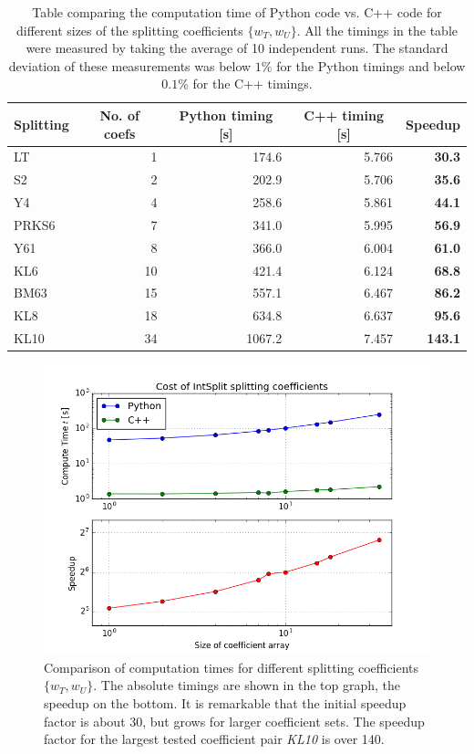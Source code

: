 %
\begin{table}[h]
	\centering
	\begin{tabular}{|l | r | r | r | r |} 
		\hline
		\multicolumn{1}{|c}{\textbf{Splitting}} &
		\multicolumn{1}{|c}{\textbf{No. of coefs}} &
		\multicolumn{1}{|c}{\textbf{Python timing [s]}} &
		\multicolumn{1}{|c}{\textbf{C++ timing [s]}} &
		\multicolumn{1}{|c|}{\textbf{Speedup}} \\
		\hline
		LT & 1 & 174.6 & 5.766 &\textbf{30.3} \\ 
		S2 & 2 & 202.9 & 5.706 &\textbf{35.6} \\
		Y4 & 4 & 258.6 & 5.861 &\textbf{44.1} \\
		PRKS6 & 7 & 341.0 & 5.995 &\textbf{56.9} \\ 
		Y61 & 8 & 366.0 & 6.004 &\textbf{61.0} \\
		KL6 & 10 & 421.4 & 6.124 &\textbf{68.8} \\
		BM63 & 15 & 557.1 & 6.467 &\textbf{86.2} \\ 
		KL8 & 18 & 634.8 & 6.637 &\textbf{95.6} \\
		KL10 & 34 & 1067.2 & 7.457 &\textbf{143.1} \\
		\hline
	\end{tabular}
	\caption{Table comparing the computation time of Python code vs. C++ code for different sizes of the splitting coefficients $\{ w_T, w_U \}$. All the timings in the table were measured by taking the average of 10 independent runs. The standard deviation of these measurements was below $1\%$ for the Python timings and below $0.1\%$ for the C++ timings.}
	\label{tab:benchmarksplit_t}
\end{table}
%
\begin{figure}[ht]
	\centering
	\begin{center}
	\includegraphics[width=.8\textwidth]{figures/coefficient_analysis.png}
	\end{center}
	\caption{Comparison of computation times for different splitting coefficients $\{ w_T, w_U \}$. The absolute timings are shown in the top graph, the speedup on the bottom. It is remarkable that the initial speedup factor is about 30, but grows for larger coefficient sets. The speedup factor for the largest tested coefficient pair \emph{KL10} is over 140.}
	\label{fig:benchmarksplit_f}
\end{figure}


